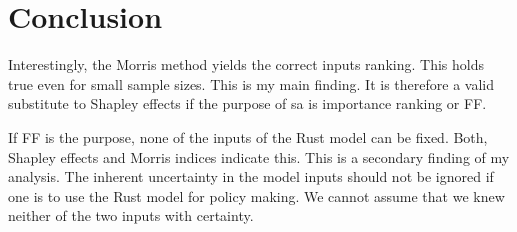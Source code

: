\section{Conclusion}

Interestingly, the Morris method yields the correct inputs ranking. This holds true even for small sample sizes. This is my main finding. It is therefore a valid substitute to Shapley effects if the purpose of sa is importance ranking or FF.

If FF is the purpose, none of the inputs of the Rust model can be fixed. Both, Shapley effects and Morris indices indicate this. This is a secondary finding of my analysis. The inherent uncertainty in the model inputs should not be ignored if one is to use the Rust model for policy making. We cannot assume that we knew neither of the two inputs with certainty.